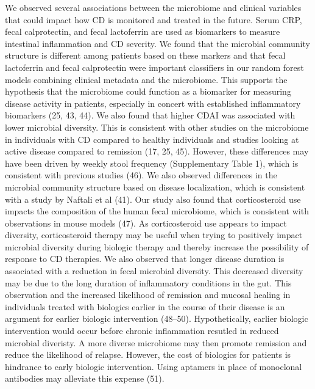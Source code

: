 \documentclass[11pt,]{article}
\begin{document}
We observed several associations between the microbiome and clinical
variables that could impact how CD is monitored and treated in the
future. Serum CRP, fecal calprotectin, and fecal lactoferrin are used as
biomarkers to measure intestinal inflammation and CD severity. We found
that the microbial community structure is different among patients based
on these markers and that fecal lactoferrin and fecal calprotectin were
important classifiers in our random forest models combining clinical
metadata and the microbiome. This supports the hypothesis that the
microbiome could function as a biomarker for measuring disease activity
in patients, especially in concert with established inflammatory
biomarkers (25, 43, 44). We also found that higher CDAI was associated
with lower microbial diversity. This is consistent with other studies on
the microbiome in individuals with CD compared to healthy individuals
and studies looking at active disease compared to remission (17, 25,
45). However, these differences may have been driven by weekly stool
frequency (Supplementary Table 1), which is consistent with previous
studies (46). We also observed differences in the microbial community
structure based on disease localization, which is consistent with a
study by Naftali et al (41). Our study also found that corticosteroid
use impacts the composition of the human fecal microbiome, which is
consistent with observations in mouse models (47). As corticosteroid use
appears to impact diversity, corticosteroid therapy may be useful when
trying to positively impact microbial diversity during biologic therapy
and thereby increase the possibility of response to CD therapies. We
also observed that longer disease duration is associated with a
reduction in fecal microbial diversity. This decreased diversity may be
due to the long duration of inflammatory conditions in the gut. This
observation and the increased likelihood of remission and mucosal
healing in individuals treated with biologics earlier in the course of
their disease is an argument for earlier biologic intervention (48--50).
Hypothetically, earlier biologic intervention would occur before chronic
inflammation resutled in reduced microbial diveristy. A more diverse
microbiome may then promote remission and reduce the likelihood of
relapse. However, the cost of biologics for patients is hindrance to
early biologic intervention. Using aptamers in place of monoclonal
antibodies may alleviate this expense (51).
\end{document}
